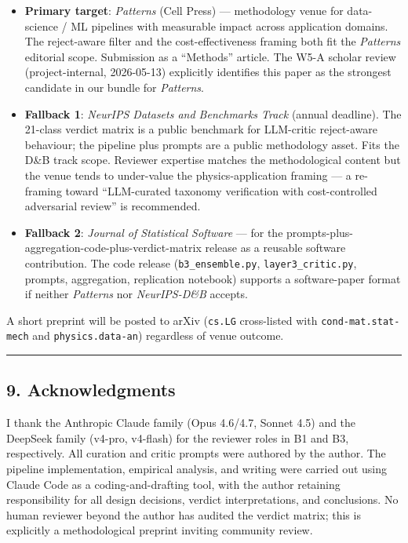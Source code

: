 \documentclass[
  letterpaper,
  11pt]{article}
\providecommand{\tightlist}{%
  \setlength{\itemsep}{0pt}\setlength{\parskip}{0pt}}
\begin{document}
\begin{itemize}
\tightlist
\item
  \textbf{Primary target}: \emph{Patterns} (Cell Press) --- methodology
  venue for data-science / ML pipelines with measurable impact across
  application domains. The reject-aware filter and the
  cost-effectiveness framing both fit the \emph{Patterns} editorial
  scope. Submission as a ``Methods'' article. The W5-A scholar review
  (project-internal, 2026-05-13) explicitly identifies this paper as the
  strongest candidate in our bundle for \emph{Patterns}.
\item
  \textbf{Fallback 1}: \emph{NeurIPS Datasets and Benchmarks Track}
  (annual deadline). The 21-class verdict matrix is a public benchmark
  for LLM-critic reject-aware behaviour; the pipeline plus prompts are a
  public methodology asset. Fits the D\&B track scope. Reviewer
  expertise matches the methodological content but the venue tends to
  under-value the physics-application framing --- a re-framing toward
  ``LLM-curated taxonomy verification with cost-controlled adversarial
  review'' is recommended.
\item
  \textbf{Fallback 2}: \emph{Journal of Statistical Software} --- for
  the prompts-plus-aggregation-code-plus-verdict-matrix release as a
  reusable software contribution. The code release
  (\texttt{b3\_ensemble.py}, \texttt{layer3\_critic.py}, prompts,
  aggregation, replication notebook) supports a software-paper format if
  neither \emph{Patterns} nor \emph{NeurIPS-D\&B} accepts.
\end{itemize}

A short preprint will be posted to arXiv (\texttt{cs.LG} cross-listed
with \texttt{cond-mat.stat-mech} and \texttt{physics.data-an})
regardless of venue outcome.

\begin{center}\rule{0.5\linewidth}{0.5pt}\end{center}

\subsection{9. Acknowledgments}\label{acknowledgments}

I thank the Anthropic Claude family (Opus 4.6/4.7, Sonnet 4.5) and the
DeepSeek family (v4-pro, v4-flash) for the reviewer roles in B1 and B3,
respectively. All curation and critic prompts were authored by the
author. The pipeline implementation, empirical analysis, and writing
were carried out using Claude Code as a coding-and-drafting tool, with
the author retaining responsibility for all design decisions, verdict
interpretations, and conclusions. No human reviewer beyond the author
has audited the verdict matrix; this is explicitly a methodological
preprint inviting community review.
\end{document}
